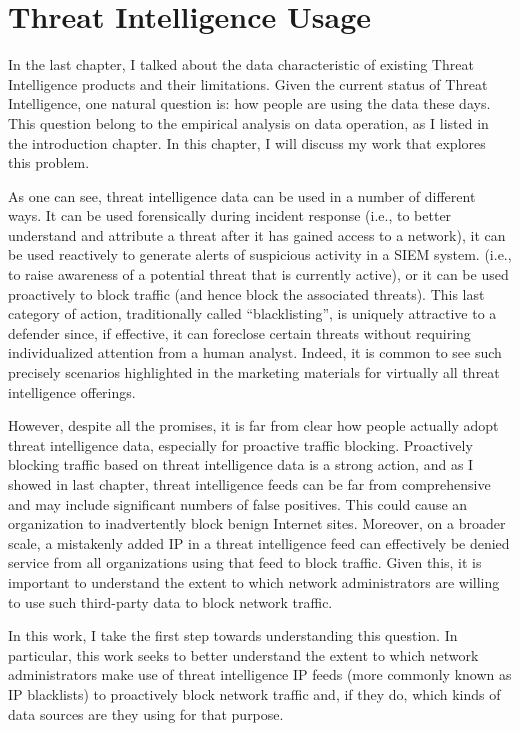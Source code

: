 \chapter{Threat Intelligence Usage}
\label{chapter:data_usage}

In the last chapter, I talked about the data characteristic of 
existing Threat Intelligence products and their limitations. Given
the current status of Threat Intelligence, one natural question is:
how people are using the data these days. This question belong to the 
empirical analysis on data operation, as I listed in the introduction
chapter. In this chapter, I will discuss my work that explores this
problem.

As one can see, threat intelligence data can be used in a number
of different ways. It can be used forensically during incident response
(i.e., to better understand and attribute a threat after it has gained
access to a network), it can be used reactively to generate alerts
of suspicious activity in a SIEM system. 
(i.e., to raise awareness of a potential threat
that is currently active), or it can be used proactively to block
traffic (and hence block the associated threats). This last category
of action, traditionally called ``blacklisting'', is uniquely
attractive to a defender since, if effective, it can foreclose certain
threats without requiring individualized attention from a human
analyst. Indeed, it is common to see such precisely scenarios
highlighted in the marketing materials for virtually all threat
intelligence offerings.

However, despite all the promises, it is far from clear how people 
actually adopt threat intelligence data, especially for proactive
traffic blocking. Proactively blocking traffic based on threat 
intelligence data is a strong action, and as I showed in last chapter,
threat intelligence feeds can be far from comprehensive and may include
significant numbers of false positives. This could cause an organization
to inadvertently block benign Internet sites. Moreover, on a broader 
scale, a mistakenly added IP in a threat intelligence feed can
effectively be denied service from all organizations using that feed
to block traffic. Given this, it is important to understand the extent
to which network administrators are willing to use such third-party data 
to block network traffic.

In this work, I take the first step towards understanding this question. 
In particular, this work seeks to better understand the extent to which 
network administrators make use of threat intelligence IP feeds
(more commonly known as IP blacklists) to proactively block network 
traffic and, if they do, which kinds of data sources are they using for 
that purpose.

